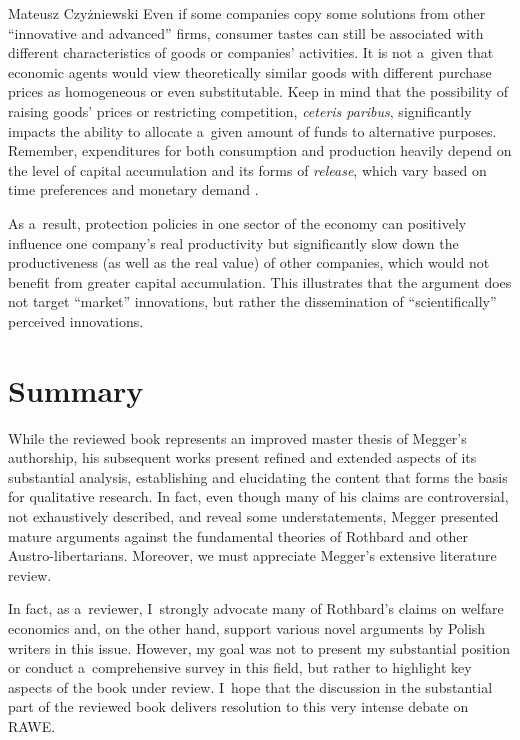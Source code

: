 \begin{newrevengenv}{Mateusz Czyżniewski}
Even if some companies copy some solutions from other ``innovative and advanced'' firms, consumer tastes can still be associated with different characteristics of goods or companies' activities. It is not a~given that economic agents would view theoretically similar goods with different purchase prices as homogeneous or even substitutable. Keep in mind that the possibility of raising goods' prices or restricting competition, \textit{ceteris paribus}, significantly impacts the ability to allocate a~given amount of funds to alternative purposes. Remember, expenditures for both consumption and production heavily depend on the level of capital accumulation and its forms of \textit{release}, which vary based on time preferences and monetary demand 
\parencite[][pp.348–362, 367–420]{rothbard_man_2009}.%




As a~result, protection policies in one sector of the economy can positively influence one company's real productivity but significantly slow down the productiveness (as well as the real value) of other companies, which would not benefit from greater capital accumulation. This illustrates that the argument does not target ``market'' innovations, but rather the dissemination of ``scientifically'' perceived innovations.



\section{Summary}

While the reviewed book represents an improved master thesis of Megger's authorship, his subsequent works present refined and extended aspects of its substantial analysis, establishing and elucidating the content that forms the basis for qualitative research. In fact, even though many of his claims are controversial, not exhaustively described, and reveal some understatements, Megger presented mature arguments against the fundamental theories of Rothbard and other Austro-libertarians. Moreover, we must appreciate Megger's extensive literature review.



In fact, as a~reviewer, I~strongly advocate many of Rothbard's claims on welfare economics and, on the other hand, support various novel arguments by Polish writers in this issue. However, my goal was not to present my substantial position or conduct a~comprehensive survey in this field, but rather to highlight key aspects of the book under review. I~hope that the discussion in the substantial part of the reviewed book delivers resolution to this very intense debate on RAWE.




\end{newrevengenv}

